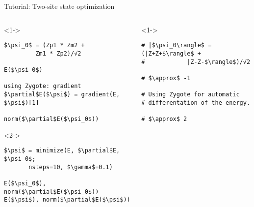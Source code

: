 \begin{frame}[fragile]{Tutorial: Two-site state optimization}


\begin{columns}

\begin{column}{5cm}

\begin{onlyenv}<1->

\begin{lstlisting}[language=JuliaLocal, style=julia, mathescape, basicstyle=\small]
$\psi_0$ = (Zp1 * Zm2 +
         Zm1 * Zp2)/√2

E($\psi_0$)

using Zygote: gradient
$\partial$E($\psi$) = gradient(E, $\psi$)[1]

norm($\partial$E($\psi_0$))
\end{lstlisting}

\end{onlyenv}

\begin{onlyenv}<2->

\begin{lstlisting}[language=JuliaLocal, style=julia, mathescape, basicstyle=\small]
$\psi$ = minimize(E, $\partial$E, $\psi_0$;
       nsteps=10, $\gamma$=0.1)

E($\psi_0$), norm($\partial$E($\psi_0$))
E($\psi$), norm($\partial$E($\psi$))
 \end{lstlisting}

\end{onlyenv}

\end{column}

\begin{column}{5cm}

\begin{onlyenv}<1->

\begin{lstlisting}[style=julia, numbers=none, mathescape, basicstyle=\small]
# |$\psi_0\rangle$ = (|Z+Z+$\rangle$ +
#            |Z-Z-$\rangle$)/√2

# $\approx$ -1

# Using Zygote for automatic
# differentation of the energy.

# $\approx$ 2
\end{lstlisting}

\end{onlyenv}


\end{column}
\end{columns}
\end{frame}
